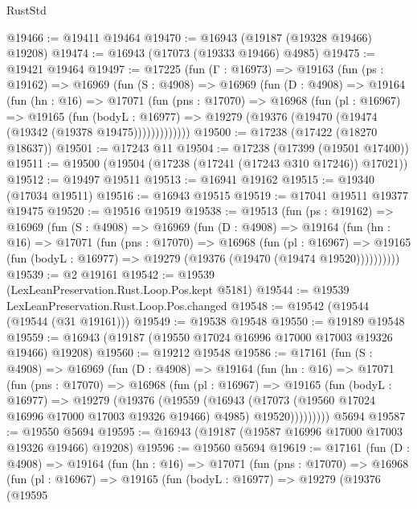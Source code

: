 \begin{lexlean}{RustStd}
\begin{coremodule}
@19466 := @19411 @19464
@19470 := @16943 (@19187 (@19328 @19466) @19208)
@19474 := @16943 (@17073 (@19333 @19466) @4985)
@19475 := @19421 @19464
@19497 := @17225
    (fun (Γ : @16973) =>
    @19163
      (fun (ps : @19162) =>
      @16969
        (fun (S : @4908) =>
        @16969
          (fun (D : @4908) =>
          @19164
            (fun (hn : @16) =>
            @17071
              (fun (pns : @17070) =>
              @16968
                (fun (pl : @16967) =>
                @19165
                  (fun (bodyL : @16977) =>
                  @19279 (@19376 (@19470 (@19474 (@19342 (@19378 @19475)))))))))))))
@19500 := @17238 (@17422 (@18270 @18637))
@19501 := @17243 @11
@19504 := @17238 (@17399 (@19501 @17400))
@19511 := @19500 (@19504 (@17238 (@17241 (@17243 @310 @17246)) @17021))
@19512 := @19497 @19511
@19513 := @16941 @19162
@19515 := @19340 (@17034 @19511)
@19516 := @16943 @19515
@19519 := @17041 @19511 @19377 @19475
@19520 := @19516 @19519
@19538 := @19513
    (fun (ps : @19162) =>
    @16969
      (fun (S : @4908) =>
      @16969
        (fun (D : @4908) =>
        @19164
          (fun (hn : @16) =>
          @17071
            (fun (pns : @17070) =>
            @16968
              (fun (pl : @16967) =>
              @19165 (fun (bodyL : @16977) => @19279 (@19376 (@19470 (@19474 @19520))))))))))
@19539 := @2 @19161
@19542 := @19539 (LexLeanPreservation.Rust.Loop.Pos.kept @5181)
@19544 := @19539 LexLeanPreservation.Rust.Loop.Pos.changed
@19548 := @19542 (@19544 (@19544 (@31 @19161)))
@19549 := @19538 @19548
@19550 := @19189 @19548
@19559 := @16943 (@19187 (@19550 @17024 @16996 @17000 @17003 @19326 @19466) @19208)
@19560 := @19212 @19548
@19586 := @17161
    (fun (S : @4908) =>
    @16969
      (fun (D : @4908) =>
      @19164
        (fun (hn : @16) =>
        @17071
          (fun (pns : @17070) =>
          @16968
            (fun (pl : @16967) =>
            @19165
              (fun (bodyL : @16977) =>
              @19279
                (@19376
                  (@19559
                    (@16943
                      (@17073 (@19560 @17024 @16996 @17000 @17003 @19326 @19466) @4985)
                      @19520)))))))))
    @5694
@19587 := @19550 @5694
@19595 := @16943 (@19187 (@19587 @16996 @17000 @17003 @19326 @19466) @19208)
@19596 := @19560 @5694
@19619 := @17161
    (fun (D : @4908) =>
    @19164
      (fun (hn : @16) =>
      @17071
        (fun (pns : @17070) =>
        @16968
          (fun (pl : @16967) =>
          @19165
            (fun (bodyL : @16977) =>
            @19279
              (@19376
                (@19595

\end{coremodule}
\end{lexlean}
